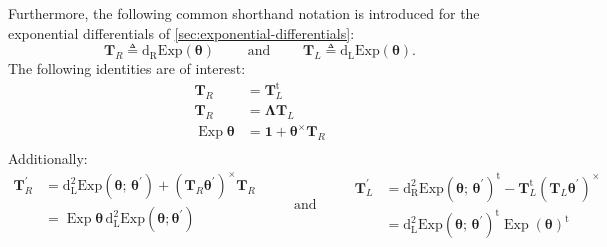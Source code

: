 Furthermore, the following common shorthand notation is introduced for the exponential differentials of \cref{sec:exponential-differentials}:
\begin{equation*} 
\mathbf{T}_{\scriptscriptstyle{R}} \triangleq \operatorname{d_{\scriptscriptstyle{R}}Exp}(\bm{\theta})
\qquad\text{ and }\qquad
\mathbf{T}_{\scriptscriptstyle{L}} \triangleq \operatorname{d_{\scriptscriptstyle{L}}Exp}(\bm{\theta}).
%
\end{equation*}
The following identities are of interest: %
\begin{equation*} 
\begin{aligned}
\mathbf{T}_{\scriptscriptstyle{R}} &= \mathbf{T}_{\scriptscriptstyle{L}}^{\mathrm{t}} \\
\mathbf{T}_{\scriptscriptstyle{R}} &= \bm{\Lambda} \mathbf{T}_{\scriptscriptstyle{L}} \\
\operatorname{Exp} \bm{\theta} &=\mathbf{1}+\bm{\theta}^{\times} \mathbf{T}_{\scriptscriptstyle{R}} \\
\end{aligned}
\end{equation*}
%
Additionally:
\begin{equation*} 
\begin{aligned}
\mathbf{T}_{\scriptscriptstyle{R}}^{\prime} &= \operatorname{d^2_{L}Exp}(\bm{\theta};\,\bm{\theta}^{\prime}) +  \left(\mathbf{T}_{\scriptscriptstyle{R}}\bm{\theta}^{\prime}\right)^\times \mathbf{T}_{\scriptscriptstyle{R}} \\
  &=  \operatorname{Exp}\bm{\theta} \, \operatorname{d^2_{\scriptscriptstyle{L}}Exp}(\bm{\theta}; \bm{\theta}^{\prime}) \\
\end{aligned}
  \qquad\text{ and }\qquad
\begin{aligned}
\mathbf{T}_{\scriptscriptstyle{L}}^\prime
&= \operatorname{d^2_{\scriptscriptstyle{R}}Exp}\left({\bm{\theta}};\,\bm{\theta}^{\prime}\right)^{\mathrm{t}} - \mathbf{T}_{\scriptscriptstyle{L}}^{\mathrm{t}} \left(\mathbf{T}_{\scriptscriptstyle{L}}\bm{\theta}^{\prime}\right)^{\times} \\
  &= \operatorname{d^2_{\scriptscriptstyle{L}}Exp}\left(\bm{\theta}; \, \bm{\theta}^{\prime}\right)^{\mathrm{t}} \operatorname{Exp}(\bm{\theta})^{\mathrm{t}}
\end{aligned}
%
\end{equation*}
 
